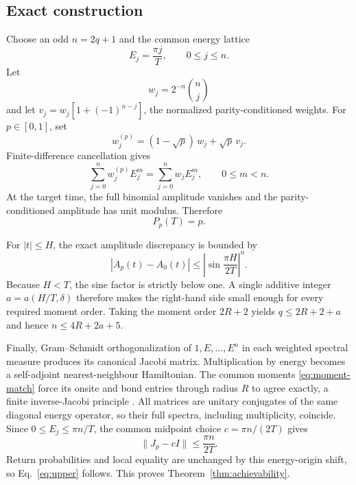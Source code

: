 \documentclass[10pt]{article}
\numberwithin{equation}{section}
\theoremstyle{definition}
\theoremstyle{remark}
\newcommand{\norm}[1]{\lVert #1\rVert}
\begin{document}
\subsection{Exact construction}

Choose an odd \(n=2q+1\) and the common energy lattice
\begin{equation}
 E_j=\frac{\pi j}{T},\qquad 0\le j\le n .
\label{eq:energies}
\end{equation}
Let
\[
 w_j=2^{-n}\binom nj
\]
and let \(v_j=w_j[1+(-1)^{n-j}]\), the normalized parity-conditioned
weights.  For \(p\in[0,1]\), set
\begin{equation}
 w_j^{(p)}=(1-\sqrt p)\,w_j+\sqrt p\,v_j .
\label{eq:weights}
\end{equation}
Finite-difference cancellation gives
\begin{equation}
 \sum_{j=0}^n w_j^{(p)}E_j^m
 =\sum_{j=0}^n w_jE_j^m,
 \qquad 0\le m<n .
\label{eq:moment-match}
\end{equation}
At the target time, the full binomial amplitude vanishes and the
parity-conditioned amplitude has unit modulus.  Therefore
\begin{equation}
 P_p(T)=p.
\label{eq:target}
\end{equation}

For \(|t|\le H\), the exact amplitude discrepancy is bounded by
\begin{equation}
 |A_p(t)-A_0(t)|
 \le
 \left|\sin\frac{\pi H}{2T}\right|^n .
\label{eq:window}
\end{equation}
Because \(H<T\), the sine factor is strictly below one.  A single additive
integer \(a=a(H/T,\delta)\) therefore makes the right-hand side small enough
for every required moment order.  Taking the moment order \(2R+2\) yields
\(q\le2R+2+a\) and hence \(n\le4R+2a+5\).

Finally, Gram--Schmidt orthogonalization of
\(1,E,\ldots,E^n\) in each weighted spectral measure produces its canonical
Jacobi matrix.  Multiplication by energy becomes a self-adjoint
nearest-neighbour Hamiltonian.  The common moments
\eqref{eq:moment-match} force its onsite and bond entries through radius
\(R\) to agree exactly, a finite inverse-Jacobi principle
\cite{GesztesySimon1997,SimonOPRL}.  All matrices are unitary conjugates of
the same diagonal energy operator, so their full spectra, including
multiplicity, coincide.  Since \(0\le E_j\le\pi n/T\), the common midpoint
choice \(c=\pi n/(2T)\) gives
\[
 \norm{J_p-cI}\le\frac{\pi n}{2T}.
\]
Return probabilities and local equality are unchanged by this energy-origin
shift, so Eq.~\eqref{eq:upper} follows.  This proves
Theorem~\ref{thm:achievability}.
\end{document}
